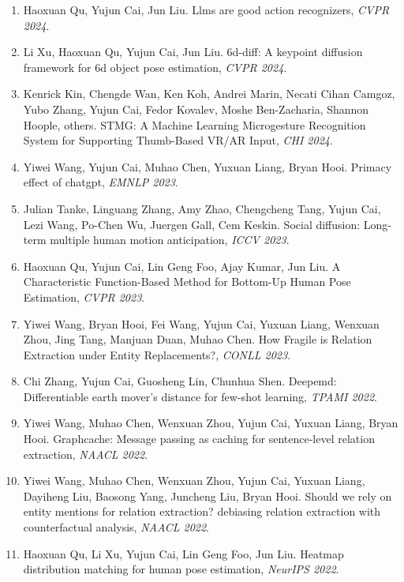 \begin{enumerate}
\item Haoxuan Qu, Yujun Cai, Jun Liu. Llms are good action recognizers, \textit{CVPR 2024}.

\item Li Xu, Haoxuan Qu, Yujun Cai, Jun Liu. 6d-diff: A keypoint diffusion framework for 6d object pose estimation, \textit{CVPR 2024}.

\item Kenrick Kin, Chengde Wan, Ken Koh, Andrei Marin, Necati Cihan Camgoz, Yubo Zhang, Yujun Cai, Fedor Kovalev, Moshe Ben-Zacharia, Shannon Hoople, others. STMG: A Machine Learning Microgesture Recognition System for Supporting Thumb-Based VR/AR Input, \textit{CHI 2024}.

\item Yiwei Wang, Yujun Cai, Muhao Chen, Yuxuan Liang, Bryan Hooi. Primacy effect of chatgpt, \textit{EMNLP 2023}.

\item Julian Tanke, Linguang Zhang, Amy Zhao, Chengcheng Tang, Yujun Cai, Lezi Wang, Po-Chen Wu, Juergen Gall, Cem Keskin. Social diffusion: Long-term multiple human motion anticipation, \textit{ICCV 2023}.

\item Haoxuan Qu, Yujun Cai, Lin Geng Foo, Ajay Kumar, Jun Liu. A Characteristic Function-Based Method for Bottom-Up Human Pose Estimation, \textit{CVPR 2023}.

\item Yiwei Wang, Bryan Hooi, Fei Wang, Yujun Cai, Yuxuan Liang, Wenxuan Zhou, Jing Tang, Manjuan Duan, Muhao Chen. How Fragile is Relation Extraction under Entity Replacements?, \textit{CONLL 2023}.

\item Chi Zhang, Yujun Cai, Guosheng Lin, Chunhua Shen. Deepemd: Differentiable earth mover's distance for few-shot learning, \textit{TPAMI 2022}.

\item Yiwei Wang, Muhao Chen, Wenxuan Zhou, Yujun Cai, Yuxuan Liang, Bryan Hooi. Graphcache: Message passing as caching for sentence-level relation extraction, \textit{NAACL 2022}.

\item Yiwei Wang, Muhao Chen, Wenxuan Zhou, Yujun Cai, Yuxuan Liang, Dayiheng Liu, Baosong Yang, Juncheng Liu, Bryan Hooi. Should we rely on entity mentions for relation extraction? debiasing relation extraction with counterfactual analysis, \textit{NAACL 2022}.

\item Haoxuan Qu, Li Xu, Yujun Cai, Lin Geng Foo, Jun Liu. Heatmap distribution matching for human pose estimation, \textit{NeurIPS 2022}.


\end{enumerate}
